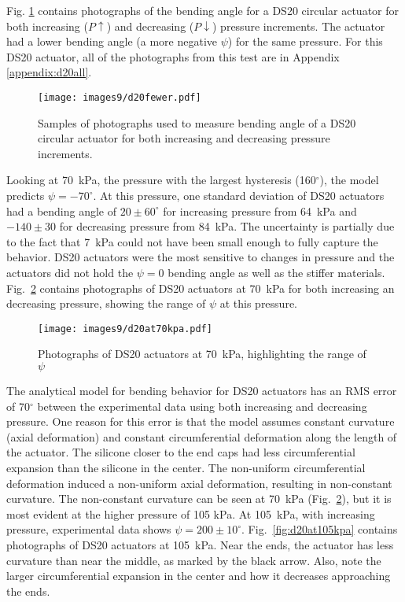 Fig. \ref{fig:d20fewer} contains photographs of the bending angle for a DS20 circular actuator for both increasing ($P\uparrow$) and decreasing ($P\downarrow$) pressure increments. The actuator had a lower bending angle (a more negative $\psi$) for the same pressure. For this DS20 actuator, all of the photographs from this test are in Appendix \ref{appendix:d20all}.

\begin{figure}[!ht]
    \centering
    \texttt{[image: images9/d20fewer.pdf]}
    \caption{Samples of photographs used to measure bending angle of a DS20 circular actuator for both increasing and decreasing pressure increments.}
    \label{fig:d20fewer}
\end{figure}

\clearpage
Looking at 70~kPa, the pressure with the largest hysteresis (160$^\circ$), the model predicts $\psi=-70^\circ$. At this pressure, one standard deviation of DS20 actuators had a bending angle of $20\pm60^\circ$ for increasing pressure from 64~kPa and $-140\pm30$ for decreasing pressure from 84~kPa. The uncertainty is partially due to the fact that 7~kPa could not have been small enough to fully capture the behavior. DS20 actuators were the most sensitive to changes in pressure and the actuators did not hold the $\psi=0$ bending angle as well as the stiffer materials. Fig.~\ref{fig:d20at70kpa} contains photographs of DS20 actuators at 70~kPa for both increasing an decreasing pressure, showing the range of $\psi$ at this pressure.

\begin{figure}[!ht]
    \centering
     \texttt{[image: images9/d20at70kpa.pdf]}
    \caption{Photographs of DS20 actuators at 70~kPa, highlighting the range of $\psi$}
    \label{fig:d20at70kpa}
\end{figure}

The analytical model for bending behavior for DS20 actuators has an RMS error of 70$^\circ$ between the experimental data using both increasing and decreasing pressure. One reason for this error is that the model assumes constant curvature (axial deformation) and constant circumferential deformation along the length of the actuator. The silicone closer to the end caps had less circumferential expansion than the silicone in the center. The non-uniform circumferential deformation induced a non-uniform axial deformation, resulting in non-constant curvature. The non-constant curvature can be seen at 70~kPa (Fig.~\ref{fig:d20at70kpa}), but it is most evident at the higher pressure of 105 kPa. At 105~kPa, with increasing pressure, experimental data shows $\psi=200\pm10^\circ$. Fig.~\ref{fig:d20at105kpa} contains photographs of DS20 actuators at 105~kPa. Near the ends, the actuator has less curvature than near the middle, as marked by the black arrow. Also, note the larger circumferential expansion in the center and how it decreases approaching the ends. 


